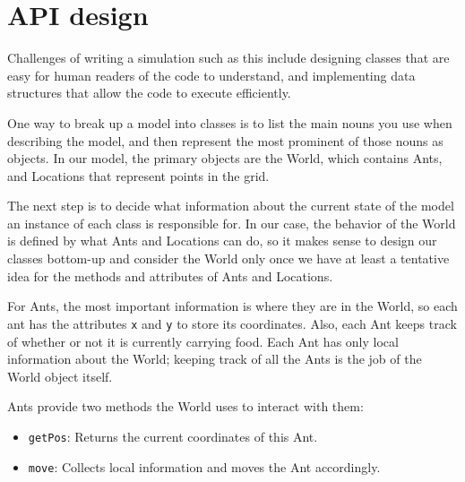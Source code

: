\documentclass[10pt]{book}
\begin{document}
\section{API design}

Challenges of writing a simulation such as this include designing
classes that are easy for human readers of the code to
understand, and implementing data structures that allow the
code to execute efficiently.

One way to break up a model into classes is to list the main nouns you
use when describing the model, and then represent the most prominent
of those nouns as objects. In our model, the primary objects are the
World, which contains Ants, and Locations that represent points in
the grid.

The next step is to decide what information about the current state of
the model an instance of each class is responsible for. In our case,
the behavior of the World is defined by what Ants and Locations
can do, so it makes sense to design our classes bottom-up and consider
the World only once we have at least a tentative idea for the methods
and attributes of Ants and Locations.

For Ants, the most important information is where they are in the
World, so each ant has the attributes \texttt{x} and \texttt{y} to
store its coordinates. Also, each Ant keeps track of whether or not it
is currently carrying food.  Each Ant has only local information about
the World; keeping track of all the Ants is the job of the World
object itself.

Ants provide two methods the World uses to interact with them:

\begin{itemize}

 \item \texttt{getPos}: Returns the current coordinates of this Ant.

 \item \texttt{move}:  Collects local information and moves the Ant accordingly.

\end{itemize}

\end{document}
